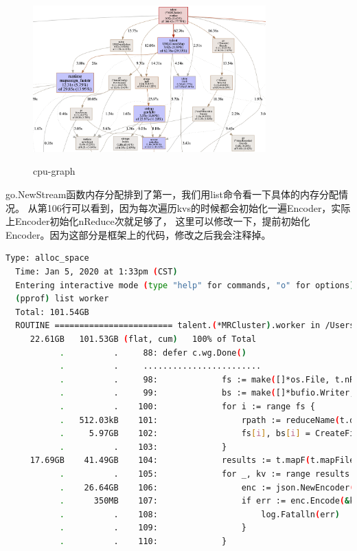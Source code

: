 \documentclass[UTF8]{ctexart}
\begin{document}
\begin{figure}[H]
  \centering
  \includegraphics[width=0.8\textwidth]{fig/cpu-graph.png}\\
  \caption{cpu-graph}
  \label{cpu-graph}
\end{figure}
go.NewStream函数内存分配排到了第一，我们用list命令看一下具体的内存分配情况。
从第106行可以看到，因为每次遍历kvs的时候都会初始化一遍Encoder，实际上Encoder初始化nReduce次就足够了，
这里可以修改一下，提前初始化Encoder。因为这部分是框架上的代码，修改之后我会注释掉。
\begin{lstlisting}[language=bash]
  Type: alloc_space
  Time: Jan 5, 2020 at 1:33pm (CST)
  Entering interactive mode (type "help" for commands, "o" for options)
  (pprof) list worker
  Total: 101.54GB
  ROUTINE ======================== talent.(*MRCluster).worker in /Users/yangs/Projects/talent-plan/tidb/mapreduce/mapreduce.go
     22.61GB   101.53GB (flat, cum)   100% of Total
           .          .     88:	defer c.wg.Done()
           .          .     ........................
           .          .     98:				fs := make([]*os.File, t.nReduce)
           .          .     99:				bs := make([]*bufio.Writer, t.nReduce)
           .          .    100:				for i := range fs {
           .   512.03kB    101:					rpath := reduceName(t.dataDir, t.jobName, t.taskNumber, i)
           .     5.97GB    102:					fs[i], bs[i] = CreateFileAndBuf(rpath)
           .          .    103:				}
     17.69GB    41.49GB    104:				results := t.mapF(t.mapFile, string(content))
           .          .    105:				for _, kv := range results {
           .    26.64GB    106:					enc := json.NewEncoder(bs[ihash(kv.Key)%t.nReduce])
           .      350MB    107:					if err := enc.Encode(&kv); err != nil {
           .          .    108:						log.Fatalln(err)
           .          .    109:					}
           .          .    110:				}
\end{lstlisting}
\end{document}
